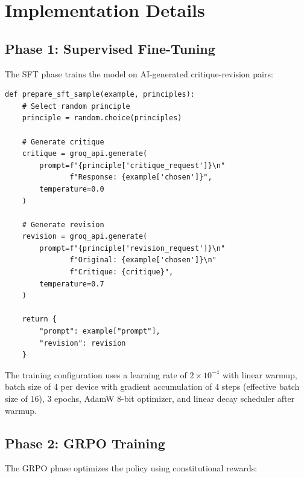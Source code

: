 \documentclass[conference]{IEEEtran}
\begin{document}
\section{Implementation Details}

\subsection{Phase 1: Supervised Fine-Tuning}

The SFT phase trains the model on AI-generated critique-revision pairs:

\begin{lstlisting}[caption={SFT Data Preparation}]
def prepare_sft_sample(example, principles):
    # Select random principle
    principle = random.choice(principles)
    
    # Generate critique
    critique = groq_api.generate(
        prompt=f"{principle['critique_request']}\n"
               f"Response: {example['chosen']}",
        temperature=0.0
    )
    
    # Generate revision
    revision = groq_api.generate(
        prompt=f"{principle['revision_request']}\n"
               f"Original: {example['chosen']}\n"
               f"Critique: {critique}",
        temperature=0.7
    )
    
    return {
        "prompt": example["prompt"],
        "revision": revision
    }
\end{lstlisting}

The training configuration uses a learning rate of $2 \times 10^{-4}$ with linear warmup, batch size of 4 per device with gradient accumulation of 4 steps (effective batch size of 16), 3 epochs, AdamW 8-bit optimizer, and linear decay scheduler after warmup.

\subsection{Phase 2: GRPO Training}

The GRPO phase optimizes the policy using constitutional rewards:
\end{document}

